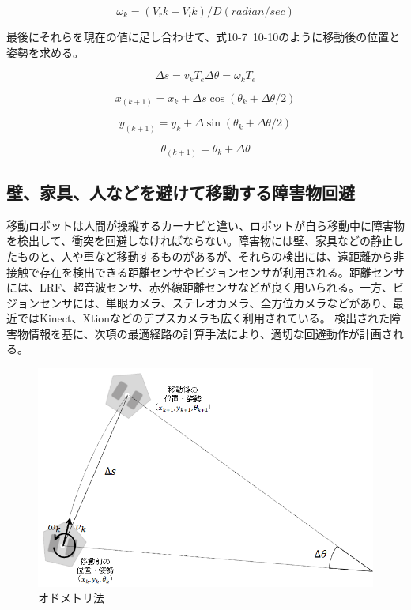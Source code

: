 \begin{equation}
\omega_k=(V_rk-V_lk)/D     (radian/sec)
\end{equation}

最後にそれらを現在の値に足し合わせて、式10-7~10-10のように移動後の位置と姿勢を求める。

\begin{equation}
\Delta s=v_k T_e
\Delta\theta=\omega_k T_e
\end{equation}

\begin{equation}
x_(k+1)=x_k+\Delta s \cos(\theta_k+\Delta\theta/2)
\end{equation}

\begin{equation}
y_(k+1)=y_k+\Delta \sin(\theta_k+\Delta\theta/2)
\end{equation}

\begin{equation}
\theta_(k+1)=\theta_k+\Delta\theta
\end{equation}

\subsection{壁、家具、人などを避けて移動する障害物回避}

移動ロボットは人間が操縦するカーナビと違い、ロボットが自ら移動中に障害物を検出して、衝突を回避しなければならない。障害物には壁、家具などの静止したものと、人や車など移動するものがあるが、それらの検出には、遠距離から非接触で存在を検出できる距離センサやビジョンセンサが利用される。距離センサには、LRF、超音波センサ、赤外線距離センサなどが良く用いられる。一方、ビジョンセンサには、単眼カメラ、ステレオカメラ、全方位カメラなどがあり、最近ではKinect、Xtionなどのデプスカメラも広く利用されている。  検出された障害物情報を基に、次項の最適経路の計算手法により、適切な回避動作が計画される。

\begin{figure}[htp]
  \centering
  \includegraphics[width=\columnwidth]{pictures/chapter10/pic_10_03.png}
  \caption{オドメトリ法}
\end{figure}

